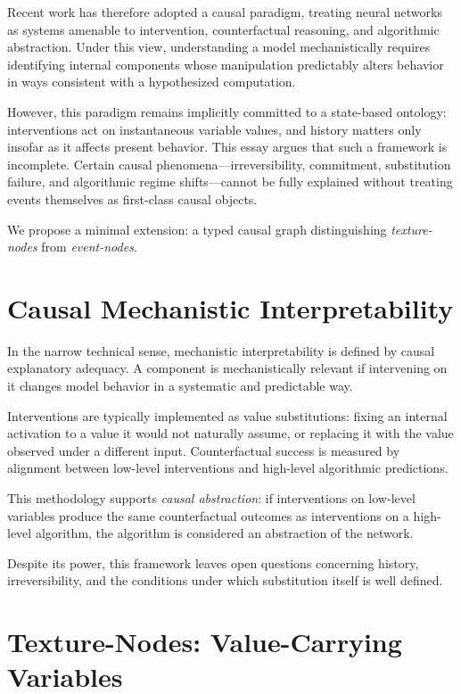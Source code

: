 \documentclass[11pt]{article}
\begin{document}
Recent work has therefore adopted a causal paradigm, treating neural networks
as systems amenable to intervention, counterfactual reasoning, and algorithmic
abstraction. Under this view, understanding a model mechanistically requires
identifying internal components whose manipulation predictably alters behavior
in ways consistent with a hypothesized computation.

However, this paradigm remains implicitly committed to a state-based ontology:
interventions act on instantaneous variable values, and history matters only
insofar as it affects present behavior. This essay argues that such a framework
is incomplete. Certain causal phenomena—irreversibility, commitment,
substitution failure, and algorithmic regime shifts—cannot be fully explained
without treating events themselves as first-class causal objects.

We propose a minimal extension: a typed causal graph distinguishing
\emph{texture-nodes} from \emph{event-nodes}.

\section{Causal Mechanistic Interpretability}

In the narrow technical sense, mechanistic interpretability is defined by causal
explanatory adequacy. A component is mechanistically relevant if intervening on
it changes model behavior in a systematic and predictable way.

Interventions are typically implemented as value substitutions: fixing an
internal activation to a value it would not naturally assume, or replacing it
with the value observed under a different input. Counterfactual success is
measured by alignment between low-level interventions and high-level algorithmic
predictions.

This methodology supports \emph{causal abstraction}: if interventions on
low-level variables produce the same counterfactual outcomes as interventions
on a high-level algorithm, the algorithm is considered an abstraction of the
network.

Despite its power, this framework leaves open questions concerning history,
irreversibility, and the conditions under which substitution itself is well
defined.

\section{Texture-Nodes: Value-Carrying Variables}
\end{document}
